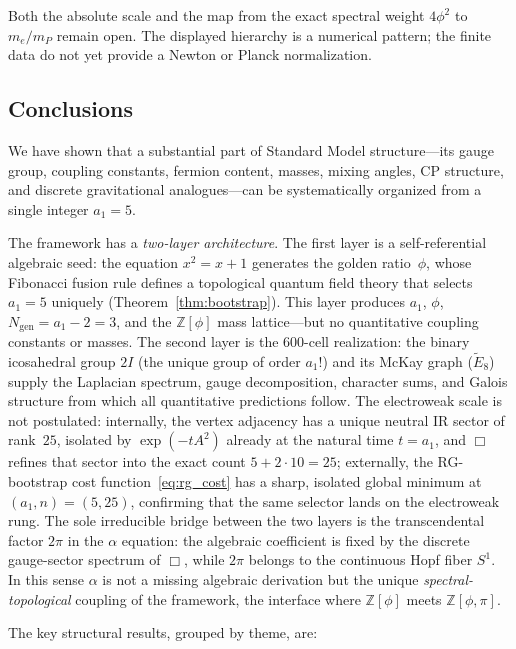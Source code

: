 \documentclass[12pt,a4paper]{article}
\theoremstyle{definition}
\begin{document}
Both the absolute scale and the map from the exact spectral weight $4\phi^2$
to $m_e/m_P$ remain open.  The displayed hierarchy is a numerical pattern;
the finite data do not yet provide a Newton or Planck normalization.

\subsection{Conclusions}

We have shown that a substantial part of Standard Model structure---its gauge group, coupling constants, fermion content, masses, mixing angles, CP structure, and discrete gravitational analogues---can be systematically organized from a single integer $a_1 = 5$.

The framework has a \emph{two-layer architecture}.  The first layer is a self-referential algebraic seed: the equation $x^2 = x + 1$ generates the golden ratio~$\phi$, whose Fibonacci fusion rule defines a topological quantum field theory that selects $a_1 = 5$ uniquely (Theorem~\ref{thm:bootstrap}).  This layer produces $a_1$, $\phi$, $N_{\text{gen}} = a_1 - 2 = 3$, and the $\mathbb{Z}[\phi]$ mass lattice---but no quantitative coupling constants or masses.  The second layer is the 600-cell realization: the binary icosahedral group $2I$ (the unique group of order $a_1!$) and its McKay graph ($\widetilde{E}_8$) supply the Laplacian spectrum, gauge decomposition, character sums, and Galois structure from which all quantitative predictions follow.  The electroweak scale is not postulated: internally, the vertex adjacency has a unique neutral IR sector of rank~$25$, isolated by $\exp(-tA^2)$ already at the natural time $t=a_1$, and $\Box$ refines that sector into the exact count $5 + 2\cdot10 = 25$; externally, the RG-bootstrap cost function~\eqref{eq:rg_cost} has a sharp, isolated global minimum at $(a_1, n) = (5,25)$, confirming that the same selector lands on the electroweak rung.  The sole irreducible bridge between the two layers is the transcendental factor $2\pi$ in the $\alpha$ equation: the algebraic coefficient is fixed by the discrete gauge-sector spectrum of $\Box$, while $2\pi$ belongs to the continuous Hopf fiber $S^1$.  In this sense $\alpha$ is not a missing algebraic derivation but the unique \emph{spectral-topological} coupling of the framework, the interface where $\mathbb{Z}[\phi]$ meets $\mathbb{Z}[\phi,\pi]$.

The key structural results, grouped by theme, are:
\end{document}

